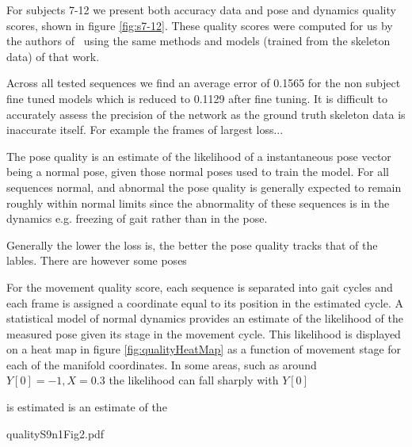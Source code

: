 \documentclass[11pt]{article} %
\begin{document}
For subjects 7-12 we present both accuracy data and pose and dynamics quality scores, shown in figure \ref{fig:s7-12}. These quality scores were computed for us by the authors of~\cite{Paiement} using the same methods and models (trained from the skeleton data) of that work. 

Across all tested sequences we find an average error of 0.1565 for the non subject fine tuned models which is reduced to 0.1129 after fine tuning. It is difficult to accurately assess the precision of the network as the ground truth skeleton data is inaccurate itself. For example the frames of largest loss...


The pose quality is an estimate of the likelihood of a instantaneous pose vector being a normal pose, given those normal poses used to train the model. For all sequences normal, and abnormal the pose quality is generally expected to remain roughly within normal limits since the abnormality of these sequences is in the dynamics e.g. freezing of gait rather than in the pose. 

Generally the lower the loss is, the better the pose quality tracks that of the lables. There are however some poses 

For the movement quality score, each sequence is separated into gait cycles and each frame is assigned a coordinate equal to its position in the estimated cycle. A statistical model of normal dynamics provides an estimate of the likelihood of the measured pose given its stage in the movement cycle. This likelihood is displayed on a heat map in figure \ref{fig:qualityHeatMap} as a function of movement stage for each of the manifold coordinates. In some areas, such as around $Y[0]=-1,X=0.3$  the likelihood can fall sharply with $Y[0]$  

 is estimated  is an estimate of the

qualityS9n1Fig2.pdf
\end{document}

